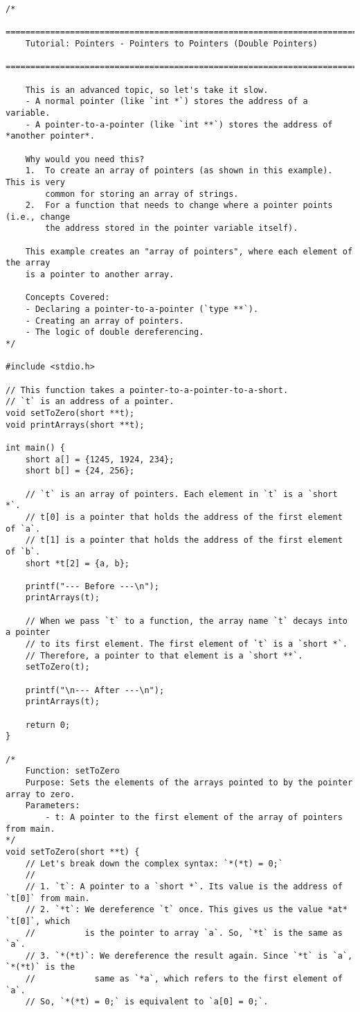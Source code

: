 \documentclass[11pt]{book}
\begin{document}
\begin{verbatim}
/*
    ================================================================================
    Tutorial: Pointers - Pointers to Pointers (Double Pointers)
    ================================================================================

    This is an advanced topic, so let's take it slow.
    - A normal pointer (like `int *`) stores the address of a variable.
    - A pointer-to-a-pointer (like `int **`) stores the address of *another pointer*.

    Why would you need this?
    1.  To create an array of pointers (as shown in this example). This is very
        common for storing an array of strings.
    2.  For a function that needs to change where a pointer points (i.e., change
        the address stored in the pointer variable itself).

    This example creates an "array of pointers", where each element of the array
    is a pointer to another array.

    Concepts Covered:
    - Declaring a pointer-to-a-pointer (`type **`).
    - Creating an array of pointers.
    - The logic of double dereferencing.
*/

#include <stdio.h>

// This function takes a pointer-to-a-pointer-to-a-short.
// `t` is an address of a pointer.
void setToZero(short **t);
void printArrays(short **t);

int main() {
    short a[] = {1245, 1924, 234};
    short b[] = {24, 256};

    // `t` is an array of pointers. Each element in `t` is a `short *`.
    // t[0] is a pointer that holds the address of the first element of `a`.
    // t[1] is a pointer that holds the address of the first element of `b`.
    short *t[2] = {a, b};

    printf("--- Before ---\n");
    printArrays(t);

    // When we pass `t` to a function, the array name `t` decays into a pointer
    // to its first element. The first element of `t` is a `short *`.
    // Therefore, a pointer to that element is a `short **`.
    setToZero(t);

    printf("\n--- After ---\n");
    printArrays(t);

    return 0;
}

/*
    Function: setToZero
    Purpose: Sets the elements of the arrays pointed to by the pointer array to zero.
    Parameters:
        - t: A pointer to the first element of the array of pointers from main.
*/
void setToZero(short **t) {
    // Let's break down the complex syntax: `*(*t) = 0;`
    //
    // 1. `t`: A pointer to a `short *`. Its value is the address of `t[0]` from main.
    // 2. `*t`: We dereference `t` once. This gives us the value *at* `t[0]`, which
    //          is the pointer to array `a`. So, `*t` is the same as `a`.
    // 3. `*(*t)`: We dereference the result again. Since `*t` is `a`, `*(*t)` is the
    //            same as `*a`, which refers to the first element of `a`.
    // So, `*(*t) = 0;` is equivalent to `a[0] = 0;`.


\end{verbatim}
\end{document}
